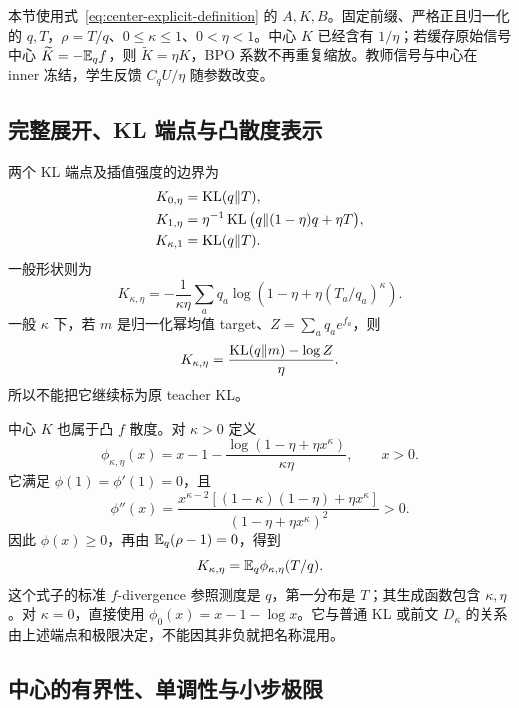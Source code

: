 本节使用式~\eqref{eq:center-explicit-definition} 的 $A,K,B$。固定前缀、严格正且归一化的 $q,T$，$\rho=T/q$、$0\le\kappa\le1$、$0<\eta<1$。中心 $K$ 已经含有 $1/\eta$；若缓存原始信号中心 $\widetilde K=-\mathbb E_qf$，则 $\widetilde K=\eta K$，BPO 系数不再重复缩放。教师信号与中心在 inner 冻结，学生反馈 $C_qU/\eta$ 随参数改变。

\subsection{完整展开、KL 端点与凸散度表示}

两个 KL 端点及插值强度的边界为
\begin{align}
 K_{0,\eta}&=\operatorname{KL}(q\Vert T),\\
 K_{1,\eta}&=\eta^{-1}\operatorname{KL}\big(q\Vert(1-\eta)q+\eta T\big),\\
 K_{\kappa,1}&=\operatorname{KL}(q\Vert T).
 \label{eq:divergence-map-center-endpoints}
\end{align}
一般形状则为
\begin{equation}
 \boxed{K_{\kappa,\eta}
 =-\frac1{\kappa\eta}\sum_aq_a
 \log\left(1-\eta+\eta(T_a/q_a)^\kappa\right).}
 \label{eq:center-expanded-k}
\end{equation}
一般 $\kappa$ 下，若 $m$ 是归一化幂均值 target、$Z=\sum_aq_ae^{f_a}$，则
\begin{equation}
 K_{\kappa,\eta}=\frac{\operatorname{KL}(q\Vert m)-\log Z}{\eta}.
\end{equation}
所以不能把它继续标为原 teacher KL。

中心 $K$ 也属于凸 $f$ 散度。对 $\kappa>0$ 定义
\begin{equation}
 \phi_{\kappa,\eta}(x)=x-1-
 \frac{\log(1-\eta+\eta x^\kappa)}{\kappa\eta},\qquad x>0.
 \label{eq:center-convex-generator}
\end{equation}
它满足 $\phi(1)=\phi'(1)=0$，且
\begin{equation}
 \phi''(x)=
 \frac{x^{\kappa-2}[(1-\kappa)(1-\eta)+\eta x^\kappa]}
 {(1-\eta+\eta x^\kappa)^2}>0.
\end{equation}
因此 $\phi(x)\ge0$，再由 $\mathbb E_q(\rho-1)=0$，得到
\begin{equation}
 K_{\kappa,\eta}=\mathbb E_q\phi_{\kappa,\eta}(T/q).
 \label{eq:divergence-map-center-family}
\end{equation}
这个式子的标准 $f$-divergence 参照测度是 $q$，第一分布是 $T$；其生成函数包含 $\kappa,\eta$。对 $\kappa=0$，直接使用 $\phi_0(x)=x-1-\log x$。它与普通 KL 或前文 $D_\kappa$ 的关系由上述端点和极限决定，不能因其非负就把名称混用。
\subsection{中心的有界性、单调性与小步极限}

